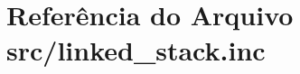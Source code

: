 \hypertarget{linked__stack_8inc}{}\section{Referência do Arquivo src/linked\+\_\+stack.inc}
\label{linked__stack_8inc}
